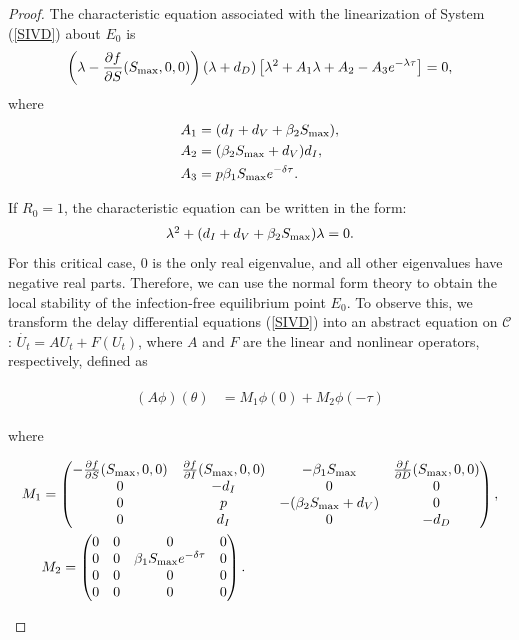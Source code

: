 \documentclass{CMHPhD-SIVD}
\begin{document}
\begin{proof}
The characteristic equation associated with the linearization of System (\ref{SIVD}) about $E_0$ is
\begin{equation}\label{4}
	\left(\lambda-\frac{\partial f}{\partial S} (S_{\text{max}}, 0, 0)\right)(\lambda+d_D)\left[\lambda^2+A_1\lambda+A_2-A_3e^{-\lambda\tau}\right]=0,
\end{equation}
where
\begin{align*}
&A_1=(d_I+d_V+\beta_2 S_{\text{max}}),\\
&A_2=(\beta_2 S_{\text{max}}+d_V)d_I,\\
&A_3=p\beta_1 S_{\text{max}} e^{-\delta\tau}.
\end{align*}



If $R_0=1$, the characteristic equation  can be written in the form:
\begin{equation}\label{25}
   \begin{array}{ll}
     \lambda^2+(d_I+d_V+\beta_2 S_{\text{max}})\lambda=0.
   \end{array}
\end{equation}
For this critical case, 0 is the only real eigenvalue, and all other eigenvalues have negative real parts. Therefore, we can use the normal form theory \cite{faria2000normal,hassard1981theory} to obtain the local stability of the infection-free equilibrium point $E_0$. To observe this, we transform the delay differential equations (\ref{SIVD}) into an abstract equation on $\mathcal{C}$: $\dot{U_t}=AU_t+F(U_t)$, where $A$ and $F$ are the linear and nonlinear operators, respectively, defined as

\begin{align}\label{26}
\begin{split}
     (A\phi)(\theta)&=M_1 \phi(0)
     +M_2\phi(-\tau)
     \end{split}
\end{align}

where
\begin{small}
\begin{eqnarray*}
M_{1}&=
\begin{pmatrix}
       -\frac{\partial f}{\partial S}(S_{\text{max}}, 0, 0) & \frac{\partial f}{\partial I}(S_{\text{max}}, 0, 0) & -\beta_1 S_{\text{max}} & \frac{\partial f }{\partial D}(S_{\text{max}}, 0, 0) \\
       0 & -d_I & 0 & 0 \\
       0 & p & -(\beta_2 S_{\text{max}}+d_V) & 0 \\
       0 & d_I & 0 & -d_D
     \end{pmatrix},\nonumber \\
&
M_{2}=
\begin{pmatrix}
     0 & 0 & 0 & 0  \\
        0 & 0 & \beta_1 S_{\text{max}} e^{-\delta \tau} & 0 \\
        0 & 0 & 0 & 0  \\
        0 & 0 & 0 & 0
     \end{pmatrix}.
\end{eqnarray*}
\end{small}


\end{proof}
\end{document}
